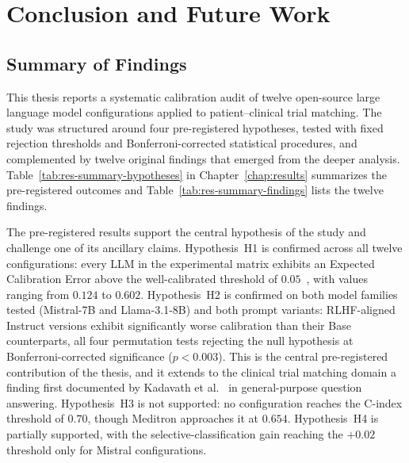 
\chapter{Conclusion and Future Work}
\label{chap:conclusion}

\section{Summary of Findings}
\label{sec:conc-summary}

This thesis reports a systematic calibration audit of twelve open-source 
large language model configurations applied to patient--clinical trial 
matching. The study was structured around four pre-registered hypotheses, 
tested with fixed rejection thresholds and Bonferroni-corrected 
statistical procedures, and complemented by twelve original findings that 
emerged from the deeper analysis. Table~\ref{tab:res-summary-hypotheses} 
in Chapter~\ref{chap:results} summarizes the pre-registered outcomes 
and Table~\ref{tab:res-summary-findings} lists the twelve findings.

The pre-registered results support the central hypothesis of the study 
and challenge one of its ancillary claims. Hypothesis~H1 is confirmed 
across all twelve configurations: every LLM in the experimental matrix 
exhibits an Expected Calibration Error above the well-calibrated 
threshold of $0.05$~\cite{vancalster2019calibration}, with values 
ranging from $0.124$ to $0.602$. Hypothesis~H2 is confirmed on both 
model families tested (Mistral-7B and Llama-3.1-8B) and both prompt 
variants: RLHF-aligned Instruct versions exhibit significantly worse 
calibration than their Base counterparts, all four permutation tests 
rejecting the null hypothesis at Bonferroni-corrected significance 
($p < 0.003$). This is the central pre-registered contribution of the 
thesis, and it extends to the clinical trial matching domain a finding 
first documented by Kadavath et al.~\cite{kadavath2022know} in 
general-purpose question answering. Hypothesis~H3 is not supported: no 
configuration reaches the C-index threshold of $0.70$, though Meditron 
approaches it at $0.654$. Hypothesis~H4 is partially supported, with 
the selective-classification gain reaching the $+0.02$ threshold only 
for Mistral configurations.

